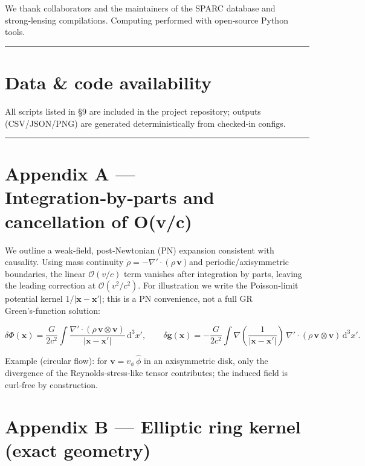 \documentclass[11pt,a4paper]{article}
\begin{document}
We thank collaborators and the maintainers of the SPARC database and strong‑lensing compilations. Computing performed with open‑source Python tools.


\medskip\hrule\medskip


\section{Data \& code availability}


All scripts listed in §9 are included in the project repository; outputs (CSV/JSON/PNG) are generated deterministically from checked‑in configs.


\medskip\hrule\medskip


\section{Appendix A — Integration‑by‑parts and cancellation of O(v/c)}


We outline a weak‑field, post‑Newtonian (PN) expansion consistent with causality. Using mass continuity $\allowbreak \dot\rho=-\nabla'\!\cdot(\rho\,\mathbf{v})$\allowbreak  and periodic/axisymmetric boundaries, the linear $\mathcal{O}(v/c)$ term vanishes after integration by parts, leaving the leading correction at $\mathcal{O}(v^2/c^2)$. For illustration we write the Poisson‑limit potential kernel $\allowbreak 1/\lvert \mathbf{x}-\mathbf{x}'\rvert$\allowbreak ; this is a PN convenience, not a full GR Green’s‑function solution:


\begin{equation}
\delta\Phi(\mathbf{x}) = \frac{G}{2c^2} \int \frac{\nabla'\!\cdot(\rho\,\mathbf{v}\!\otimes\!\mathbf{v})}{\lvert \mathbf{x}-\mathbf{x}'\rvert}\,\mathrm{d}^3\!x' ,\qquad
\delta\mathbf{g}(\mathbf{x}) = -\frac{G}{2c^2} \int \nabla\!\left(\frac{1}{\lvert \mathbf{x}-\mathbf{x}'\rvert}\right) \, \nabla'\!\cdot(\rho\,\mathbf{v}\!\otimes\!\mathbf{v})\,\mathrm{d}^3\!x' .
\end{equation}


Example (circular flow): for $\mathbf{v}=v_\phi\,\hat\phi$ in an axisymmetric disk, only the divergence of the Reynolds‑stress‑like tensor contributes; the induced field is curl‑free by construction.


\section{Appendix B — Elliptic ring kernel (exact geometry)}
\end{document}
